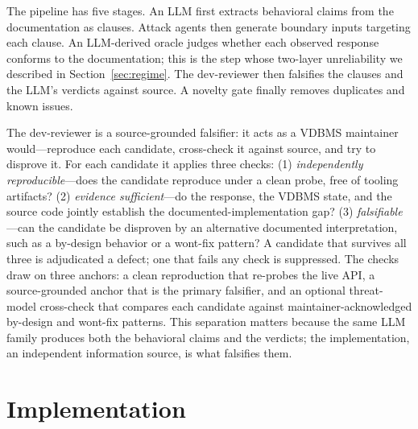 \documentclass[sigconf]{acmart}
\begin{document}
The pipeline has five stages. An LLM first extracts behavioral claims from the documentation as clauses. Attack agents then generate boundary inputs targeting each clause. An LLM-derived oracle judges whether each observed response conforms to the documentation; this is the step whose two-layer unreliability we described in Section~\ref{sec:regime}. The dev-reviewer then falsifies the clauses and the LLM's verdicts against source. A novelty gate finally removes duplicates and known issues.

The dev-reviewer is a source-grounded falsifier: it acts as a VDBMS maintainer would---reproduce each candidate, cross-check it against source, and try to disprove it. For each candidate it applies three checks: (1) \emph{independently reproducible}---does the candidate reproduce under a clean probe, free of tooling artifacts? (2) \emph{evidence sufficient}---do the response, the VDBMS state, and the source code jointly establish the documented-implementation gap? (3) \emph{falsifiable}---can the candidate be disproven by an alternative documented interpretation, such as a by-design behavior or a wont-fix pattern? A candidate that survives all three is adjudicated a defect; one that fails any check is suppressed. The checks draw on three anchors: a clean reproduction that re-probes the live API, a source-grounded anchor that is the primary falsifier, and an optional threat-model cross-check that compares each candidate against maintainer-acknowledged by-design and wont-fix patterns. This separation matters because the same LLM family produces both the behavioral claims and the verdicts; the implementation, an independent information source, is what falsifies them.

\section{Implementation} \label{sec:impl}
\end{document}
